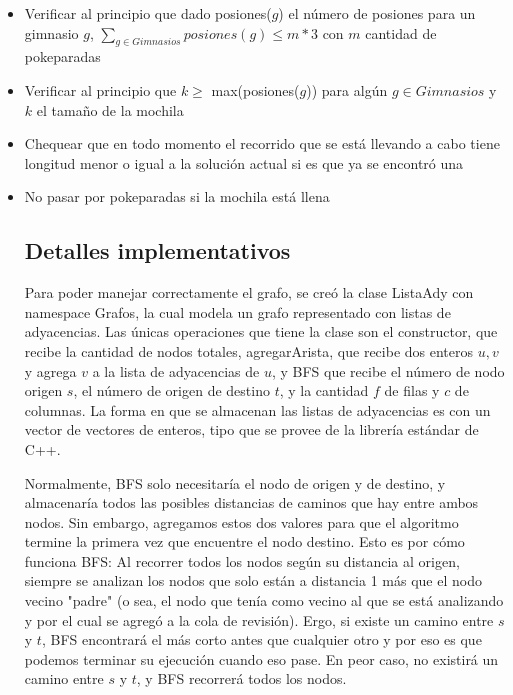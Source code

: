            \begin{itemize}
                \item{Verificar al principio que dado posiones($g$) el número de posiones para un gimnasio $g$, \newline $\sum_{g \in Gimnasios} posiones(g) \leq m*3$ con $m$ cantidad de pokeparadas}
                \item{Verificar al principio que $k \geq$ max(posiones($g$)) para algún $g \in Gimnasios$ y $k$ el tamaño de la mochila}
                \item{Chequear que en todo momento el recorrido que se está llevando a cabo tiene longitud menor o igual a la solución actual si es que ya se encontró una}
                \item{No pasar por pokeparadas si la mochila está llena}


        \subsection{Detalles implementativos}
            Para poder manejar correctamente el grafo, se creó la clase ListaAdy con namespace Grafos, la cual modela un grafo representado con listas de adyacencias. Las únicas operaciones que tiene la clase son el constructor, que recibe la cantidad de nodos totales, agregarArista, que recibe dos enteros $u,v$ y agrega $v$ a la lista de adyacencias de $u$, y BFS que recibe el número de nodo origen $s$, el número de origen de destino $t$, y la cantidad $f$ de filas y $c$ de columnas.
            La forma en que se almacenan las listas de adyacencias es con un vector de vectores de enteros, tipo que se provee de la librería estándar de C++.

            Normalmente, BFS solo necesitaría el nodo de origen y de destino, y almacenaría todos las posibles distancias de caminos que hay entre ambos nodos. Sin embargo, agregamos estos dos valores para que el algoritmo termine la primera vez que encuentre el nodo destino. Esto es por cómo funciona BFS: Al recorrer todos los nodos según su distancia al origen, siempre se analizan los nodos que solo están a distancia 1 más que el nodo vecino "padre" (o sea, el nodo que tenía como vecino al que se está analizando y por el cual se agregó a la cola de revisión). Ergo, si existe un camino entre $s$ y $t$, BFS encontrará el más corto antes que cualquier otro y por eso es que podemos terminar su ejecución cuando eso pase. En peor caso, no existirá un camino entre $s$ y $t$, y BFS recorrerá todos los nodos.


\end{itemize}
